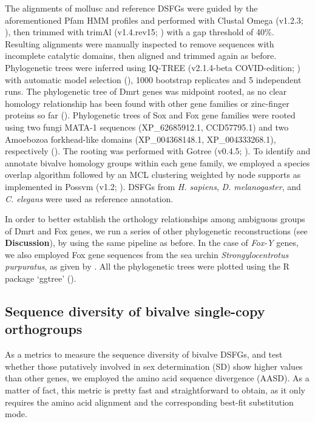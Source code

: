 \documentclass[../main.tex]{subfiles}
\begin{document}
The alignments of mollusc and reference DSFGs were guided by the aforementioned Pfam HMM profiles and performed with Clustal Omega (v1.2.3; \textbf{\cite{sievers2011fast}}), then trimmed with trimAl (v1.4.rev15; \textbf{\cite{capella2009trimal}}) with a gap threshold of 40\%. Resulting alignments were manually inspected to remove sequences with incomplete catalytic domains, then aligned and trimmed again as before. Phylogenetic trees were inferred using IQ-TREE (v2.1.4-beta COVID-edition; \textbf{\cite{minh2020iq}}) with automatic model selection (\textbf{\cite{kalyaanamoorthy2017modelfinder}}), 1000 bootstrap replicates and 5 independent runs. The phylogenetic tree of Dmrt genes was midpoint rooted, as no clear homology relationship has been found with other gene families or zinc-finger proteins so far (\textbf{\cite{wexler2014pan}}). Phylogenetic trees of Sox and Fox gene families were rooted using two fungi MATA-1 sequences (XP\_62685912.1, CCD57795.1) and two Amoebozoa forkhead-like domains (XP\_004368148.1, XP\_004333268.1), respectively (\textbf{\cite{heenan2016evolution,nakagawa2013dna}}). The rooting was performed with Gotree (v0.4.5; \textbf{\cite{lemoine2021gotree}}). To identify and annotate bivalve homology groups within each gene family, we employed a species overlap algorithm followed by an MCL clustering weighted by node supports as implemented in Possvm (v1.2; \textbf{\cite{grau2021orthology}}). DSFGs from \textit{H. sapiens}, \textit{D. melanogaster}, and \textit{C. elegans} were used as reference annotation.

In order to better establish the orthology relationships among ambiguous groups of Dmrt and Fox genes, we run a series of other phylogenetic reconstructions (see \textbf{Discussion}), by using the same pipeline as before. In the case of \textit{Fox-Y} genes, we also employed Fox gene sequences from the sea urchin \textit{Strongylocentrotus purpuratus}, as given by \textbf{\cite{tu2006sea}}. All the phylogenetic trees were plotted using the R package ‘ggtree’ (\textbf{\cite{yu2017ggtree}}).

\subsection{Sequence diversity of bivalve single-copy orthogroups}
As a metrics to measure the sequence diversity of bivalve DSFGs, and test whether those putatively involved in sex determination (SD) show higher values than other genes, we employed the amino acid sequence divergence (AASD). As a matter of fact, this metric is pretty fast and straightforward to obtain, as it only requires the amino acid alignment and the corresponding best-fit substitution mode.
\end{document}
